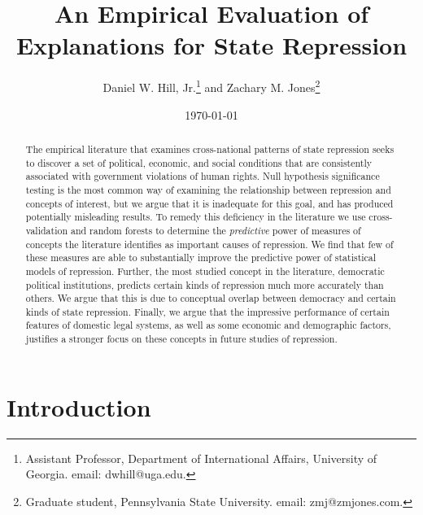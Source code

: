 \documentclass[12pt]{article}
\begin{document}
\vspace{50mm}
\date{\today}
\title{An Empirical Evaluation of Explanations for State Repression}
\bigskip
\author{Daniel W. Hill, Jr.\thanks{Assistant Professor, Department of International Affairs,
University of Georgia. email: dwhill@uga.edu.} and Zachary M. Jones\thanks{Graduate student, Pennsylvania State University. email: zmj@zmjones.com.}}

\maketitle \thispagestyle{empty}

\clearpage
\onehalfspace

\begin{abstract}
The empirical literature that examines cross-national patterns of state repression seeks to discover a set of political, economic, and social conditions that are consistently associated with government violations of human rights. Null hypothesis significance testing is the most common way of examining the relationship  between repression and concepts of interest, but we argue that it is inadequate for this goal, and has produced potentially misleading results. To remedy this deficiency in the literature we use cross-validation and random forests to determine the {\em predictive} power of measures of concepts the literature identifies as important causes of repression. We find that few of these measures are able to substantially improve the predictive power of statistical models of repression. Further, the most studied concept in the literature, democratic political institutions, predicts certain kinds of repression much more accurately than others. We argue that this is due to conceptual overlap between democracy and certain kinds of state repression. Finally, we argue that the impressive performance of certain features of domestic legal systems, as well as some economic and demographic factors, justifies a stronger focus on these concepts in future studies of repression.
\end{abstract}

\clearpage

\section{Introduction}
\end{document}
